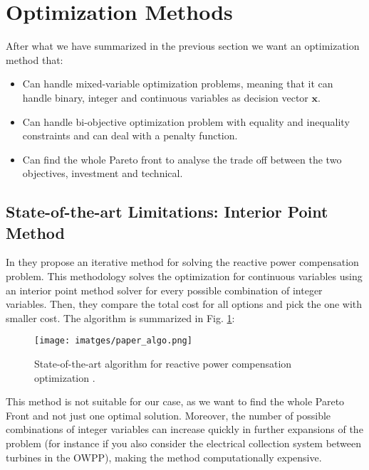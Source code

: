 \documentclass[a4paper,11pt, titlepage, twoside]{article}
\begin{document}
\section{Optimization Methods}\label{Optimization}

After what we have summarized in the previous section we want an optimization method that:
\begin{itemize}
    \item Can handle mixed-variable optimization problems, meaning that it can handle binary, integer and continuous variables as decision vector $\mathbf{x}$.
    \item Can handle bi-objective optimization problem with equality and inequality constraints and can deal with a penalty function.
    \item Can find the whole Pareto front to analyse the trade off between the two objectives, investment and technical.
\end{itemize}

\subsection{State-of-the-art Limitations: Interior Point Method}\label{stateofart}

In \cite{paperbase} they propose an iterative method for solving the reactive power compensation problem. This methodology solves the optimization
for continuous variables using an interior point method solver \cite{ipm} for every possible combination of integer variables. Then, they compare the total
cost for all options and pick the one with smaller cost. The algorithm is summarized in Fig. \ref{fig:paaperalgo}:

\begin{figure}[H]
    \centering
    \texttt{[image: imatges/paper\_algo.png]}
    \caption{State-of-the-art algorithm for reactive power compensation optimization \cite{paperbase}.}
    \label{fig:paaperalgo}
\end{figure}
    


This method is not suitable for our case, as we want to find the whole Pareto Front and not just one optimal solution. Moreover, the number of possible combinations of integer variables
can increase quickly in further expansions of the problem (for instance if you also consider the electrical collection system between turbines in the OWPP), making the method computationally expensive.
\end{document}
